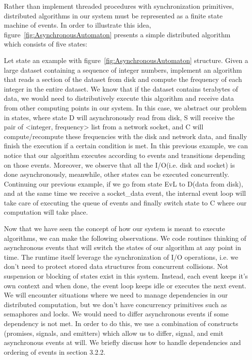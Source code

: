 \documentclass[10pt,reprint]{socc14}
\begin{document}
Rather than implement threaded procedures with synchronization primitives, distributed algorithms in our system  must be represented as a finite state machine of events. In order to illustrate this idea, figure~\ref{fig:AsynchronousAutomaton} presents a simple distributed algorithm which consists of five states: 

Let state an example with figure~\ref{fig:AsynchronousAutomaton} structure. Given a large dataset containing a sequence of integer numbers, implement an algorithm that reads a section of the dataset from disk and compute the frequency of each integer in the entire dataset. We know that if the dataset contains terabytes of data, we would need to distributively execute this algorithm and receive data from other computing points in our system. In this case, we abstract our problem in states, where state D will asynchronously read from disk, S will receive the pair of <integer, frequency> list from a network socket, and C will compute/recompute these frequencies with the disk and network data, and finally finish the execution if a certain condition is met. In this previous example, we can notice that our algorithm executes according to events and transitions depending on those events. Moreover, we observe that all the I/O(i.e. disk and socket) is done asynchronously, meanwhile, other states can be executed concurrently. Continuing our previous example, if  we go from state EvL to D(data from disk), and at the same time we receive a socket\_data event, the internal event loop will take care of executing the queue of events and finally switch state to C where our computation will take place.

Now that we have seen the concept of how our system is meant to execute algorithms, we can make the following observations.
We code routines thinking of asynchronous events that will switch the states of our algorithm at any point in time.
The runtime itself leverage the synchronization of I/O operations, i.e. we don’t need to protect stored data structures from concurrent collisions.
Not suspension or blocking of states exist in this system. Instead, each event keeps it’s own context and when done, the event loop keeps idle or executes the next event.
We will encounter situations where we need to manage dependencies in our distributed computation, but we don’t have concurrency primitives such as semaphores and locks. We would need to differ asynchronous events if some dependency is not met. In order to do this, we use a combination of constructs (promises, signals, and emitters) which allow us to differ, signal, and emit asynchronous events at will. We briefly discuss how to handle dependencies and ordering of events in section 3.2.2.
\end{document}
